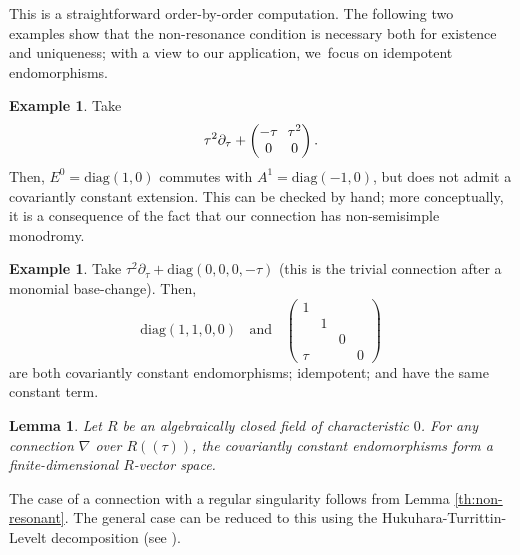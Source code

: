 \documentclass[JEP,XML,SOM,Unicode,NoFloatCountersInSection,published]{cedram}
\theoremstyle{plain}
\newtheorem{lemma}[theorem]{Lemma}
\theoremstyle{definition}
\newtheorem{example}[theorem]{Example}
\begin{document}
This is a straightforward order-by-order computation. The following two examples show that the non-resonance condition is necessary both for existence and uniqueness; with a view to our application, we~focus on idempotent endomorphisms.

\begin{example} \label{th:non-existence}
Take
\begin{equation*}\arraycolsep3.5pt
\tau^2\partial_\tau + \begin{pmatrix} -\tau & \tau^2 \\ 0 & 0 \end{pmatrix}.
\end{equation*}
Then, $E^0 = \mathrm{diag}(1,0)$ commutes with $A^1 = \mathrm{diag}(-1,0)$, but does not admit a covariantly constant extension. This can be checked by hand; more conceptually, it is a consequence of the fact that our connection has non-semisimple monodromy.
\end{example}

\begin{example} \label{th:non-uniqueness}
Take $
\tau^2\partial_\tau + \mathrm{diag}(0,0,0,-\tau)$
(this is the trivial connection after a monomial base-change). Then,
\begin{equation*}
\textstyle \mathrm{diag}(1,1,0,0) \;\; \text{ and } \;\; \left(\begin{smallmatrix} 1 &&& \\ & 1 && \\ && 0 & \\ \tau &&& 0 \end{smallmatrix}\right)
\end{equation*}
are both covariantly constant endomorphisms; idempotent; and have the same constant term.
\end{example}

\begin{lemma} \label{th:regular}
Let $R$ be an algebraically closed field of characteristic $0$. For any connection $\nabla$ over $R((\tau))$, the covariantly constant endomorphisms form a finite-dimensional $R$-vector space.
\end{lemma}

The case of a connection with a regular singularity follows from Lemma \ref{th:non-resonant}. The general case can be reduced to this using the Hukuhara-Turrittin-Levelt decomposition (see \eg \cite{babbitt-varadarajan83}).
\end{document}
